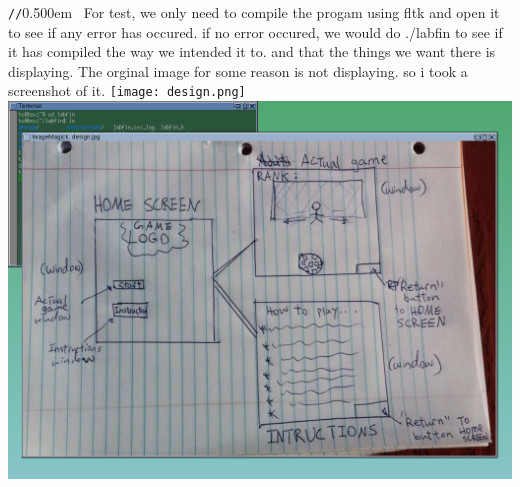 \documentclass[12pt]{article}
\begin{document}
\noindent
{\tt /}{\tt /}\kern0.500em  \
  For test, we only need to compile the progam using fltk and open it
  to see if any error has occured. if no error occured, we would do
  ./labfin to see if it has compiled the way we intended it to. 
  and that the things we want there is displaying. The orginal image
  for some reason is not displaying. so i took a screenshot of it.
  \texttt{[image: design.png]}\\
  \includegraphics[scale=0.5]{design2.png}\\
   \rm\mc 

\noindent


\rm\mc
\end{document}
